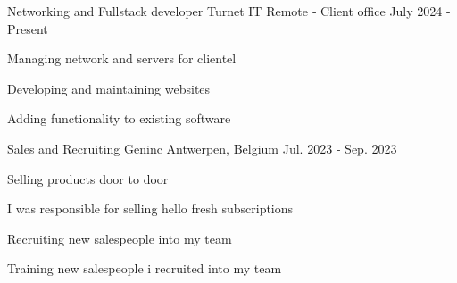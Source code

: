 

\begin{cventries}

  \cventry
    {Networking and Fullstack developer} %
    {Turnet IT} %
    {Remote ‑ Client office} %
    {July 2024 - Present} %
    {
      \begin{cvitems} %
        \item {Managing network and servers for clientel}
        \item {Developing and maintaining websites}
        \item {Adding functionality to existing software}
      \end{cvitems}
    }

  \cventry
    {Sales and Recruiting} %
    {Geninc} %
    {Antwerpen, Belgium} %
    {Jul. 2023 ‑ Sep. 2023} %
    {
      \begin{cvitems} %
        \item {Selling products door to door}
        \item {I was responsible for selling hello fresh subscriptions}
        \item {Recruiting new salespeople into my team}
        \item {Training new salespeople i recruited into my team} 
      \end{cvitems}
    }

\end{cventries}
